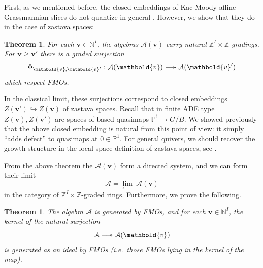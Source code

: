 \documentclass[11pt,reqno]{amsart}
\renewcommand{\mathbf}{\mathbold}
\numberwithin{equation}{section}
\newtheorem{Theorem}[equation]{Theorem}
\theoremstyle{definition}
\newcommand{\cA}{\mathcal{A}}
\newcommand{\bv}{\mathbf{v}}
\newcommand{\NN}{\mathbb{N}}
\newcommand{\PP}{\mathbb{P}}
\newcommand{\ZZ}{\mathbb{Z}}
\newcommand{\twoheadlongrightarrow}{\relbar\joinrel\twoheadrightarrow}
\renewcommand{\bv}{\mathbf{v}} %
\newcommand{\vertexset}{I}
\newcommand{\qzast}{\cA}
\begin{document}
First, as we mentioned before, the closed embeddings of Kac-Moody affine Grassmannian slices do not quantize in general \cite{MW2}. However, we show that they do in the case of zastava spaces: 
\begin{Theorem}
  For each $\bv \in \NN^\vertexset$, the algebras $\qzast(\bv)$ carry natural $\ZZ^\vertexset\times \ZZ$-gradings. For $\bv \geq \bv'$ there is a graded surjection
  \begin{equation}
    \label{eq:55}
   \Phi_{\bv, \bv'}:\qzast(\bv) \twoheadlongrightarrow \qzast(\bv') 
  \end{equation}
         which respect FMOs. 
\end{Theorem}
In the classical limit, these surjections correspond to closed embeddings $Z(\bv') \hookrightarrow Z(\bv)$ of zastava spaces. Recall that in finite ADE type $Z(\bv), Z(\bv')$ are spaces of based quasimaps $\PP^1 \rightarrow G/B$. We showed previously \cite[Theorem 2.40]{MW2} that the above closed embedding is natural from this point of view: it simply ``adds defect'' to quasimaps at $0\in \PP^1$. For general quivers, we should recover the growth structure in the local space definition of zastava spaces, see \cite[\S 1.3]{Dong}.

From the above theorem the $\qzast(\bv)$ form a directed system, and we can form their limit
\begin{equation}
  \label{eq:56}
        \qzast = \displaystyle{\lim_{\longleftarrow}}~ \cA(\bv)
\end{equation}
in the category of $\ZZ^I \times \ZZ$-graded rings. Furthermore, we prove the following.
\begin{Theorem}
  The algebra $\qzast$ is generated by FMOs, and for each $\bv \in \NN^I$, the kernel of the natural surjection
  \begin{equation}
   \qzast \twoheadlongrightarrow \qzast(\bv) 
  \end{equation}
  is  generated as an ideal by FMOs (i.e.~those FMOs lying in the kernel of the map).
\end{Theorem}
\end{document}

